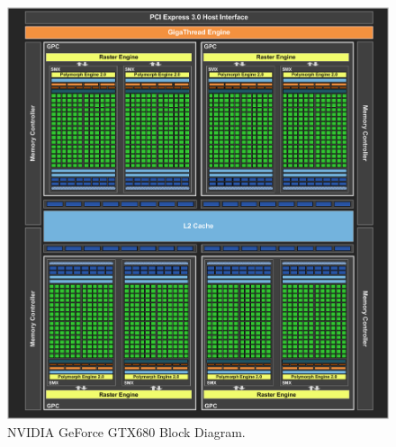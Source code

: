 \begin{figure}
\centering
\includegraphics[width=\textwidth]{Background/GeForceGTX680BlockDiagram.png}
\caption{NVIDIA GeForce GTX680 Block Diagram.}
\label{Background:GeForceGTX680BlockDiagram}
\end{figure}

